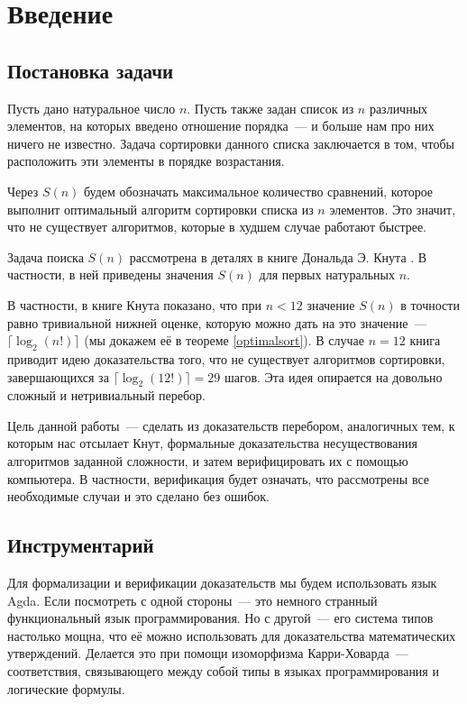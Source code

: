 \section
[Введение. Основные результаты]
{Введение}

\subsection
[Определение $S(n)$. Постановка задачи]
{Постановка задачи}

Пусть дано натуральное число $n$. Пусть также задан список из $n$ различных элементов, на которых введено отношение порядка~— и больше нам про них ничего не известно. Задача сортировки данного списка заключается в том, чтобы расположить эти элементы в порядке возрастания.

\abz Через $S(n)$ будем обозначать максимальное количество сравнений, которое выполнит оптимальный алгоритм сортировки списка из $n$ элементов. Это значит, что не существует алгоритмов, которые в худшем случае работают быстрее.

\abz Задача поиска $S(n)$ рассмотрена в деталях в книге Дональда Э. Кнута \cite{Knuth}. В частности, в ней приведены значения $S(n)$ для первых натуральных $n$.

\abz В частности, в книге Кнута показано, что при $n<12$ значение $S(n)$ в точности равно тривиальной нижней оценке, которую можно дать на это значение~— $\lceil \log_2 (n!) \rceil$ (мы докажем её в теореме \ref{optimalsort}). В случае $n=12$ книга приводит идею доказательства того, что не существует алгоритмов сортировки, завершающихся за $\lceil \log_2 (12!) \rceil = 29$ шагов. Эта идея опирается на довольно сложный и нетривиальный перебор.

\abz Цель данной работы~— сделать из доказательств перебором, аналогичных тем, к которым нас отсылает Кнут, формальные доказательства несуществования алгоритмов заданной сложности, и затем верифицировать их с помощью компьютера. В частности, верификация будет означать, что рассмотрены все необходимые случаи и это сделано без ошибок.

\subsection
[Agda и изоморфизм Карри---Ховарда]
{Инструментарий}

\abz Для формализации и верификации доказательств мы будем использовать язык Agda. Если посмотреть с одной стороны~— это немного странный функциональный язык программирования. Но с другой~— его система типов настолько мощна, что её можно использовать для доказательства математических утверждений. Делается это при помощи изоморфизма Карри-Ховарда~— соответствия, связывающего между собой типы в языках программирования и логические формулы. 


